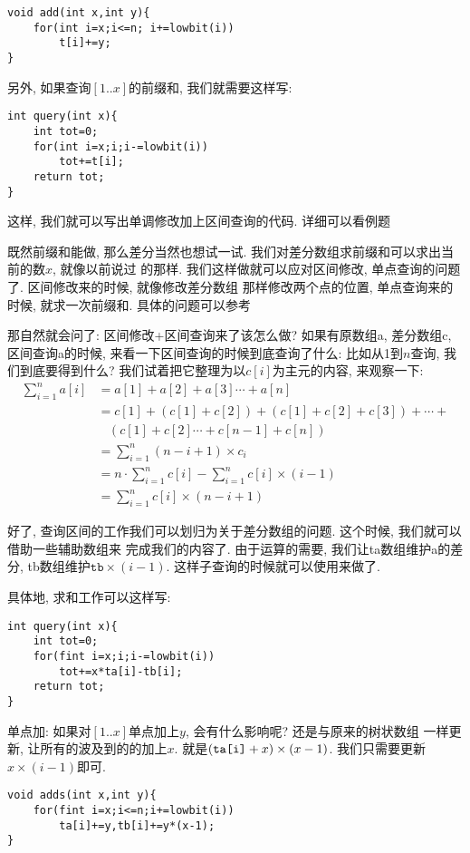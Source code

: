 \begin{lstlisting}
void add(int x,int y){
    for(int i=x;i<=n; i+=lowbit(i))
        t[i]+=y;
}
\end{lstlisting}

另外, 如果查询$[1..x]$的前缀和, 我们就需要这样写: 
\begin{lstlisting}
int query(int x){
    int tot=0;
    for(int i=x;i;i-=lowbit(i))
        tot+=t[i];
    return tot;
}
\end{lstlisting}

这样, 我们就可以写出单调修改加上区间查询的代码. 详细可以看例题

既然前缀和能做, 那么差分当然也想试一试. 我们对差分数组求前缀和可以求出当前的数$x$, 就像以前说过
的那样. 我们这样做就可以应对区间修改, 单点查询的问题了. 区间修改来的时候, 就像修改差分数组
那样修改两个点的位置, 单点查询来的时候, 就求一次前缀和. 具体的问题可以参考

那自然就会问了: 区间修改+区间查询来了该怎么做? 如果有原数组a, 差分数组c, 区间查询a的时候, 
来看一下区间查询的时候到底查询了什么: 
比如从1到$n$查询, 我们到底要得到什么? 我们试着把它整理为以$c[i]$为主元的内容, 来观察一下: 
\begin{align*}
    \sum^n_{i=1}a[i]&=a[1]+a[2]+a[3]\cdots +a[n]\\
    &=c[1]+(c[1]+c[2])+(c[1]+c[2]+c[3])+\cdots+\\ &~~~~(c[1]+c[2]\cdots +c[n{-}1]+c[n]) \\
    &=\sum_{i=1}^n{(n-i+1)\times c_i} \\
    &=n\cdot\sum_{i=1}^nc[i]-\sum_{i=1}^nc[i]\times(i-1) \\
    &=\sum_{i=1}^nc[i]\times(n{-}i+1)
\end{align*}

好了, 查询区间的工作我们可以划归为关于差分数组的问题. 这个时候, 我们就可以借助一些辅助数组来
完成我们的内容了. 由于运算的需要, 我们让ta数组维护a的差分, tb数组维护$\texttt{tb}\times 
(i-1)$. 这样子查询的时候就可以使用来做了. 

具体地, 求和工作可以这样写: 
\begin{lstlisting}
int query(int x){
    int tot=0;
    for(fint i=x;i;i-=lowbit(i))
        tot+=x*ta[i]-tb[i];
    return tot;
}
\end{lstlisting}


单点加: 如果对$[1..x]$单点加上$y$, 会有什么影响呢? 还是与原来的树状数组
一样更新, 让所有的波及到的的加上$x$. 就是$(\codeword
{ta[i]}+x)\times (x-1)$. 我们只需要更新$x\times (i-1)$即可. 
\begin{lstlisting}
void adds(int x,int y){
    for(fint i=x;i<=n;i+=lowbit(i))
        ta[i]+=y,tb[i]+=y*(x-1);
}
\end{lstlisting}


